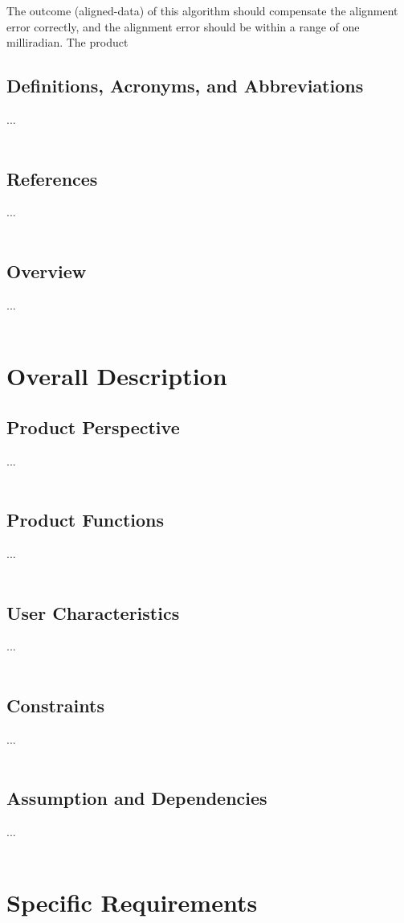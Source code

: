 The outcome (aligned-data) of this algorithm should compensate the alignment error correctly, and the alignment error should be within a range of one milliradian. The product 

\subsection{Definitions, Acronyms, and Abbreviations}
...\\\\

\subsection{References}
...\\\\

\subsection{Overview}
...\\\\




\section{Overall Description}
\subsection{Product Perspective}
...\\\\

\subsection{Product Functions}
...\\\\

\subsection{User Characteristics}
...\\\\

\subsection{Constraints}
...\\\\

\subsection{Assumption and Dependencies}
...\\\\



\section{Specific Requirements}

